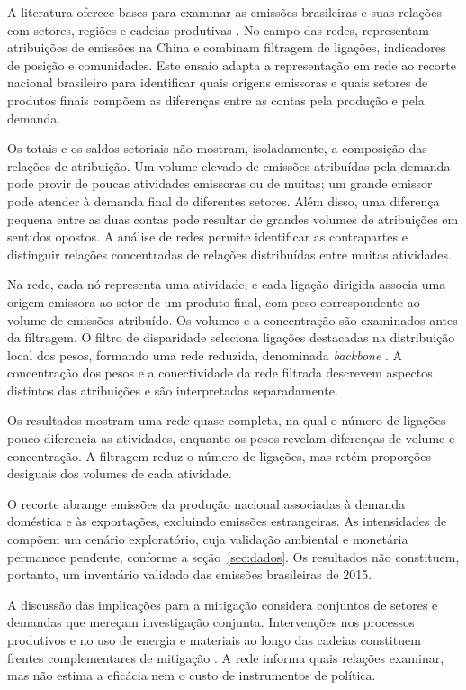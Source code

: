 A literatura oferece bases para examinar as emissões brasileiras e suas relações com setores, regiões e cadeias produtivas \parencite{imori2015,sanguinetAzzoni2024,montoyaEtAl2026}. No campo das redes, \textcite{huang2019} representam atribuições de emissões na China e combinam filtragem de ligações, indicadores de posição e comunidades. Este ensaio adapta a representação em rede ao recorte nacional brasileiro para identificar quais origens emissoras e quais setores de produtos finais compõem as diferenças entre as contas pela produção e pela demanda.

Os totais e os saldos setoriais não mostram, isoladamente, a composição das relações de atribuição. Um volume elevado de emissões atribuídas pela demanda pode provir de poucas atividades emissoras ou de muitas; um grande emissor pode atender à demanda final de diferentes setores. Além disso, uma diferença pequena entre as duas contas pode resultar de grandes volumes de atribuições em sentidos opostos. A análise de redes permite identificar as contrapartes e distinguir relações concentradas de relações distribuídas entre muitas atividades.

Na rede, cada nó representa uma atividade, e cada ligação dirigida associa uma origem emissora ao setor de um produto final, com peso correspondente ao volume de emissões atribuído. Os volumes e a concentração são examinados antes da filtragem. O filtro de disparidade seleciona ligações destacadas na distribuição local dos pesos, formando uma rede reduzida, denominada \textit{backbone} \parencite{serrano2009}. A concentração dos pesos e a conectividade da rede filtrada descrevem aspectos distintos das atribuições e são interpretadas separadamente.

Os resultados mostram uma rede quase completa, na qual o número de ligações pouco diferencia as atividades, enquanto os pesos revelam diferenças de volume e concentração. A filtragem reduz o número de ligações, mas retém proporções desiguais dos volumes de cada atividade.

O recorte abrange emissões da produção nacional associadas à demanda doméstica e às exportações, excluindo emissões estrangeiras. As intensidades de \textcite{sanguinetAzzoni2024} compõem um cenário exploratório, cuja validação ambiental e monetária permanece pendente, conforme a seção~\ref{sec:dados}. Os resultados não constituem, portanto, um inventário validado das emissões brasileiras de 2015.

A discussão das implicações para a mitigação considera conjuntos de setores e demandas que mereçam investigação conjunta. Intervenções nos processos produtivos e no uso de energia e materiais ao longo das cadeias constituem frentes complementares de mitigação \parencite{rissman2020}. A rede informa quais relações examinar, mas não estima a eficácia nem o custo de instrumentos de política.
